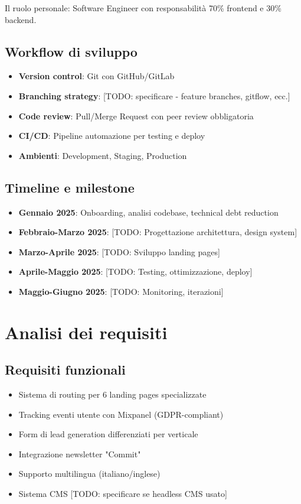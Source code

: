 Il ruolo personale: Software Engineer con responsabilità 70\% frontend e 30\% backend.

\subsection{Workflow di sviluppo}
\begin{itemize}
  \item \textbf{Version control}: Git con GitHub/GitLab
  \item \textbf{Branching strategy}: [TODO: specificare - feature branches, gitflow, ecc.]
  \item \textbf{Code review}: Pull/Merge Request con peer review obbligatoria
  \item \textbf{CI/CD}: Pipeline automazione per testing e deploy
  \item \textbf{Ambienti}: Development, Staging, Production
\end{itemize}

\subsection{Timeline e milestone}
\begin{itemize}
  \item \textbf{Gennaio 2025}: Onboarding, analisi codebase, technical debt reduction
  \item \textbf{Febbraio-Marzo 2025}: [TODO: Progettazione architettura, design system]
  \item \textbf{Marzo-Aprile 2025}: [TODO: Sviluppo landing pages]
  \item \textbf{Aprile-Maggio 2025}: [TODO: Testing, ottimizzazione, deploy]
  \item \textbf{Maggio-Giugno 2025}: [TODO: Monitoring, iterazioni]
\end{itemize}

\section{Analisi dei requisiti}
\subsection{Requisiti funzionali}
\begin{itemize}
  \item Sistema di routing per 6 landing pages specializzate
  \item Tracking eventi utente con Mixpanel (GDPR-compliant)
  \item Form di lead generation differenziati per verticale
  \item Integrazione newsletter "Commit"
  \item Supporto multilingua (italiano/inglese)
  \item Sistema CMS [TODO: specificare se headless CMS usato]
\end{itemize}

